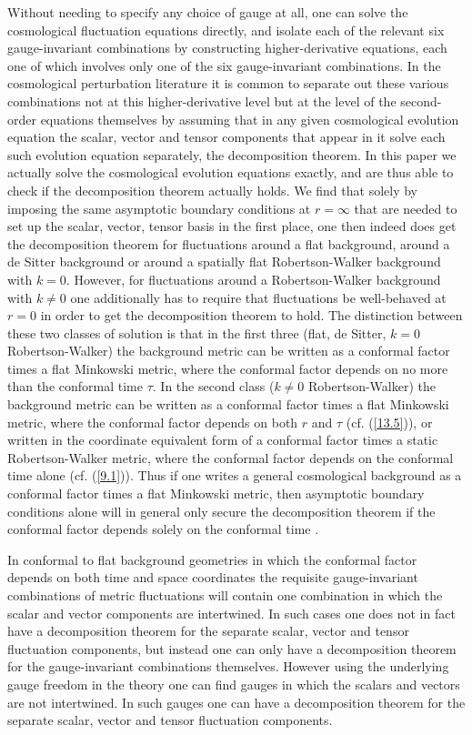 \documentclass[aps,onecolumn,10pt]{revtex4}
\numberwithin{equation}{section}
\numberwithin{equation}{section}
\begin{document}
Without needing to specify any choice of gauge at all, one can solve the cosmological fluctuation equations directly, and isolate each of the relevant six gauge-invariant combinations by constructing higher-derivative equations, each one of which involves only one of the six gauge-invariant combinations. In the cosmological perturbation literature it is common to separate out these various combinations not at this higher-derivative level but at the level of the second-order equations themselves by assuming that in any given cosmological evolution equation the scalar, vector and tensor components that appear in it solve each such evolution equation separately, the decomposition theorem. In this paper we actually solve the cosmological evolution equations exactly, and are thus able to check if the decomposition theorem actually holds. We find that solely by imposing the same asymptotic boundary conditions at $r=\infty$ that are needed to set up the scalar, vector, tensor basis in the first place, one then indeed does get the decomposition theorem for fluctuations around a flat background, around a de Sitter background or around a spatially flat Robertson-Walker background with $k=0$. However, for fluctuations around a Robertson-Walker background with $k\neq 0$ one additionally has to require that fluctuations be well-behaved at $r=0$ in order to get the decomposition theorem to hold. The distinction between these two classes of solution is that in the first three (flat, de Sitter, $k=0$ Robertson-Walker) the background metric can be written as a conformal factor times a flat Minkowski metric, where the conformal factor depends on no more than the conformal time $\tau$. In the second class ($k\neq 0$ Robertson-Walker) the background metric can be written as a conformal factor times a flat Minkowski metric, where the conformal factor depends on both $r$ and $\tau$  (cf. (\ref{13.5})), or written in the coordinate equivalent form of a conformal factor times a static Robertson-Walker metric, where the conformal factor depends on the conformal time alone (cf. (\ref{9.1})). Thus if one writes a general cosmological background as a conformal factor times a flat Minkowski metric, then asymptotic boundary conditions alone will in general only secure the decomposition theorem if the conformal factor depends solely on the conformal time  \cite{footnote12}.

In conformal to flat background geometries in which the conformal factor depends on both time and space coordinates the requisite gauge-invariant combinations of metric fluctuations will contain one combination in which the scalar and vector components are intertwined. In such cases one does not in fact have a decomposition theorem for the separate scalar, vector and tensor fluctuation components, but instead one can only have a decomposition theorem for the gauge-invariant combinations themselves. However using the underlying gauge freedom in the theory one can find gauges in which the scalars and vectors are not intertwined. In such gauges one can have a decomposition theorem for the separate scalar, vector and tensor fluctuation components.
\end{document}
